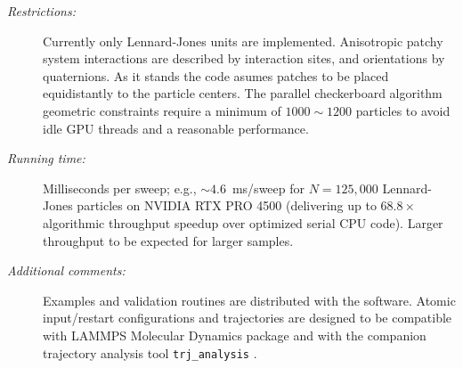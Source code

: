 \documentclass[final,5p,times,twocolumn]{elsarticle}
\begin{document}
{\begin{description}
    \item[\textit{Restrictions:}] Currently only Lennard-Jones units
      are implemented. Anisotropic patchy system interactions are described by
      interaction sites, 
    and orientations by quaternions. As it stands the code asumes
    patches to be placed equidistantly to the particle centers. The
    parallel checkerboard algorithm 
    geometric constraints require a minimum of $1000\sim 1200$
    particles to avoid idle GPU threads and a reasonable performance.  
  \item[\textit{Running time:}] Milliseconds per sweep; e.g., $\sim
    4.6$~ms/sweep for $N=125{,}000$ Lennard-Jones particles on NVIDIA
    RTX PRO 4500 
    (delivering up to $68.8\times$ algorithmic throughput speedup over
    optimized serial CPU code). Larger throughput to be expected for
    larger samples.
    \item[\textit{Additional comments:}] Examples and validation
      routines are distributed with the software. Atomic input/restart
      configurations and trajectories are designed to be compatible
      with LAMMPS Molecular Dynamics package
      \cite{thompson2022lammps} and with the companion trajectory
      analysis tool \texttt{trj\_analysis} \cite{trjanaly2026}.
\end{description}
}
\end{document}
